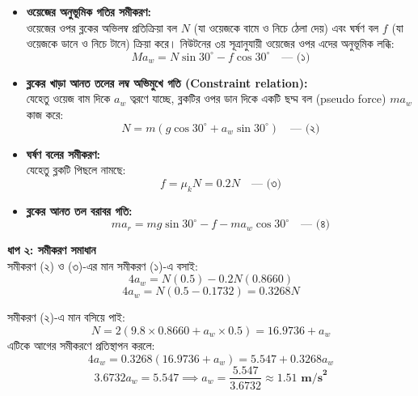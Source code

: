 \documentclass[12pt, a4paper]{article}
\begin{document}
\begin{tcolorbox}[solutionbox={সমাধান (Solution)}]
\begin{center}
\end{center}
\vspace{1em}

\begin{itemize}[leftmargin=*, parsep=0.4ex]
    \item \textbf{ওয়েজের অনুভূমিক গতির সমীকরণ:} \\
    ওয়েজের ওপর ব্লকের অভিলম্ব প্রতিক্রিয়া বল $N$ (যা ওয়েজকে বামে ও নিচে ঠেলা দেয়) এবং ঘর্ষণ বল $f$ (যা ওয়েজকে ডানে ও নিচে টানে) ক্রিয়া করে। নিউটনের ৩য় সূত্রানুযায়ী ওয়েজের ওপর এদের অনুভূমিক লব্ধি:
    $$M a_w = N \sin 30^\circ - f \cos 30^\circ \quad \text{--- (১)}$$
    
    \item \textbf{ব্লকের খাড়া আনত তলের লম্ব অভিমুখে গতি (Constraint relation):} \\
    যেহেতু ওয়েজ বাম দিকে $a_w$ ত্বরণে যাচ্ছে, ব্লকটির ওপর ডান দিকে একটি ছদ্ম বল (pseudo force) $m a_w$ কাজ করে:
    $$N = m (g \cos 30^\circ + a_w \sin 30^\circ) \quad \text{--- (২)}$$
    
    \item \textbf{ঘর্ষণ বলের সমীকরণ:} \\
    যেহেতু ব্লকটি পিছলে নামছে:
    $$f = \mu_k N = 0.2 N \quad \text{--- (৩)}$$
    
    \item \textbf{ব্লকের আনত তল বরাবর গতি:} \\
    $$m a_r = m g \sin 30^\circ - f - m a_w \cos 30^\circ \quad \text{--- (৪)}$$
\end{itemize}

\vspace{0.5em}
\noindent
\textbf{ধাপ ২: সমীকরণ সমাধান} \\
সমীকরণ (২) ও (৩)-এর মান সমীকরণ (১)-এ বসাই:
$$4 a_w = N (0.5) - 0.2 N (0.8660)$$ 
$$4 a_w = N (0.5 - 0.1732) = 0.3268 N$$

সমীকরণ (২)-এ মান বসিয়ে পাই:
$$N = 2 \left( 9.8 \times 0.8660 + a_w \times 0.5 \right) = 16.9736 + a_w$$ 
এটিকে আগের সমীকরণে প্রতিস্থাপন করলে:
$$4 a_w = 0.3268 (16.9736 + a_w) = 5.547 + 0.3268 a_w$$ 
$$3.6732 a_w = 5.547 \implies a_w = \frac{5.547}{3.6732} \approx \mathbf{1.51\text{ m/s}^2}$$


\end{tcolorbox}
\end{document}
